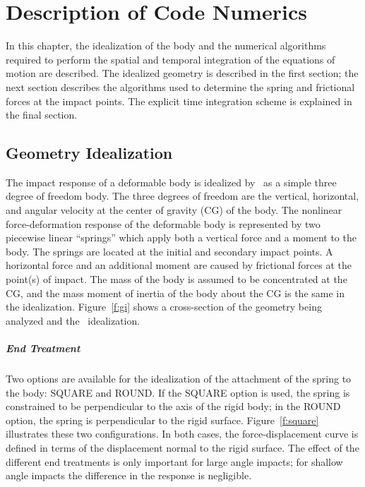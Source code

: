 \chapter{Description of Code Numerics}\label{theory}
In this chapter, the idealization of the body and the numerical
algorithms required to perform the spatial and temporal integration of
the equations of motion are described.  The idealized geometry is
described in the first section; the next section describes the
algorithms used to determine the spring and frictional forces at the
impact points.  The explicit time integration scheme is explained in the
final section.

\section{Geometry Idealization}\label{s:ideal}

The impact response of a deformable body is idealized by \SLAP\ as a
simple three degree of freedom body.  The three degrees of freedom are
the vertical, horizontal, and angular velocity at the center of gravity
(CG) of the body.  The nonlinear force-deformation response of the
deformable body is represented by two piecewise linear ``springs'' which
apply both a vertical force and a moment to the body.  The springs are
located at the initial and secondary impact points. A horizontal force
and an additional moment are caused by frictional forces at the point(s)
of impact.  The mass of the body is assumed to be concentrated at the
CG, and the mass moment of inertia of the body about the CG is the same
in the idealization. Figure~\ref{f:gi} shows a cross-section of the
geometry being analyzed and the \SLAP\ idealization. 

\paragraph*{End Treatment} Two options are available for the
idealization of the attachment of the spring to the body: {\sf SQUARE}
and {\sf ROUND}.  If the {\sf SQUARE} option is used, the spring is
constrained to be perpendicular to the axis of the rigid body; in
the {\sf ROUND} option, the spring is perpendicular to the rigid
surface.  Figure~\ref{f:square} illustrates these two configurations.
In both cases, the force-displacement curve is defined in terms of the
displacement normal to the rigid surface.  The effect of the different
end treatments is only important for large angle impacts; for shallow
angle impacts the difference in the response is negligible.

